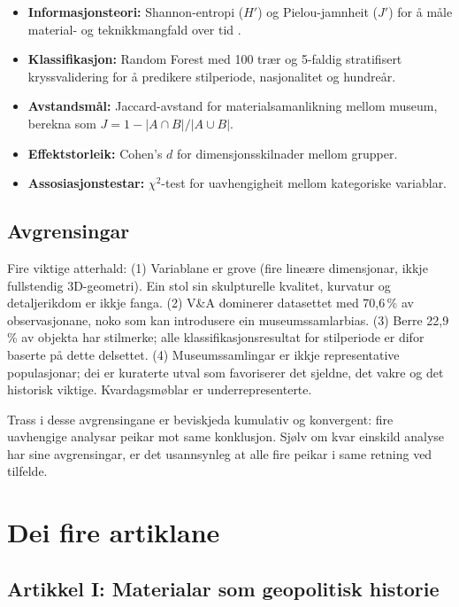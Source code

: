 \documentclass[10pt, a4paper, twocolumn]{article}
\begin{document}
\begin{itemize}
  \item \textbf{Informasjonsteori:} Shannon-entropi ($H'$) og Pielou-jamnheit ($J'$) for å måle material- og teknikkmangfald over tid \citep{shannon1948, pielou1966, magurran2004}.
  \item \textbf{Klassifikasjon:} Random Forest \citep{breiman2001} med 100 trær og 5-faldig stratifisert kryssvalidering for å predikere stilperiode, nasjonalitet og hundreår.
  \item \textbf{Avstandsmål:} Jaccard-avstand for materialsamanlikning mellom museum, berekna som $J = 1 - |A \cap B| / |A \cup B|$.
  \item \textbf{Effektstorleik:} Cohen's $d$ for dimensjonsskilnader mellom grupper.
  \item \textbf{Assosiasjonstestar:} $\chi^2$-test for uavhengigheit mellom kategoriske variablar.
\end{itemize}

\subsection{Avgrensingar}

Fire viktige atterhald: (1) Variablane er grove (fire lineære dimensjonar, ikkje fullstendig 3D-geometri). Ein stol sin skulpturelle kvalitet, kurvatur og detaljerikdom er ikkje fanga. (2) V\&A dominerer datasettet med 70,6\,\% av observasjonane, noko som kan introdusere ein museumssamlarbias. (3) Berre 22,9\,\% av objekta har stilmerke; alle klassifikasjonsresultat for stilperiode er difor baserte på dette delsettet. (4) Museumssamlingar er ikkje representative populasjonar; dei er kuraterte utval som favoriserer det sjeldne, det vakre og det historisk viktige. Kvardagsmøblar er underrepresenterte.

Trass i desse avgrensingane er beviskjeda kumulativ og konvergent: fire uavhengige analysar peikar mot same konklusjon. Sjølv om kvar einskild analyse har sine avgrensingar, er det usannsynleg at alle fire peikar i same retning ved tilfelde.


\section{Dei fire artiklane}

\subsection{Artikkel I: Materialar som geopolitisk historie}
\end{document}

